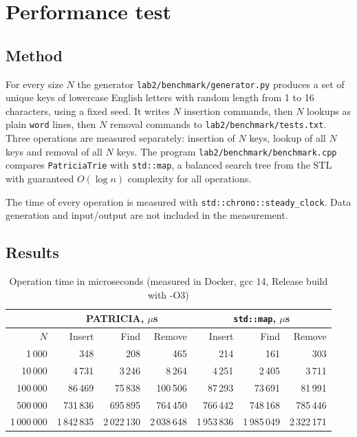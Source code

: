 \section{Performance test}

\subsection{Method}

For every size $N$ the generator \texttt{lab2/benchmark/generator.py} produces a set of unique keys
of lowercase English letters with random length from 1 to 16 characters, using a fixed seed. It
writes $N$ insertion commands, then $N$ lookups as plain \texttt{word} lines, then $N$ removal
commands to \texttt{lab2/benchmark/tests.txt}. Three operations are measured separately: insertion
of $N$ keys, lookup of all $N$ keys and removal of all $N$ keys. The program
\texttt{lab2/benchmark/benchmark.cpp} compares \texttt{PatriciaTrie} with \texttt{std::map}, a
balanced search tree from the STL with guaranteed $O(\log n)$ complexity for all operations.

The time of every operation is measured with \texttt{std::chrono::steady\_clock}. Data generation
and input/output are not included in the measurement.

\subsection{Results}

\begin{table}[!ht]
\centering
\begin{tabular}{|r|r|r|r|r|r|r|}
\hline
\rowcolor{lightgray}
& \multicolumn{3}{c|}{PATRICIA, $\mu$s} & \multicolumn{3}{c|}{\texttt{std::map}, $\mu$s} \\
\hline
\rowcolor{lightgray}
$N$ & Insert & Find & Remove & Insert & Find & Remove \\
\hline
1\,000    & 348    & 208    & 465    & 214    & 161    & 303    \\
\hline
10\,000   & 4\,731 & 3\,246 & 8\,264 & 4\,251 & 2\,405 & 3\,711 \\
\hline
100\,000  & 86\,469 & 75\,838 & 100\,506 & 87\,293 & 73\,691 & 81\,991 \\
\hline
500\,000  & 731\,836 & 695\,895 & 764\,450 & 766\,442 & 748\,168 & 785\,446 \\
\hline
1\,000\,000 & 1\,842\,835 & 2\,022\,130 & 2\,038\,648 & 1\,953\,836 & 1\,985\,049 & 2\,322\,171 \\
\hline
\end{tabular}
\caption{Operation time in microseconds (measured in Docker, gcc 14, Release build with -O3)}
\end{table}


